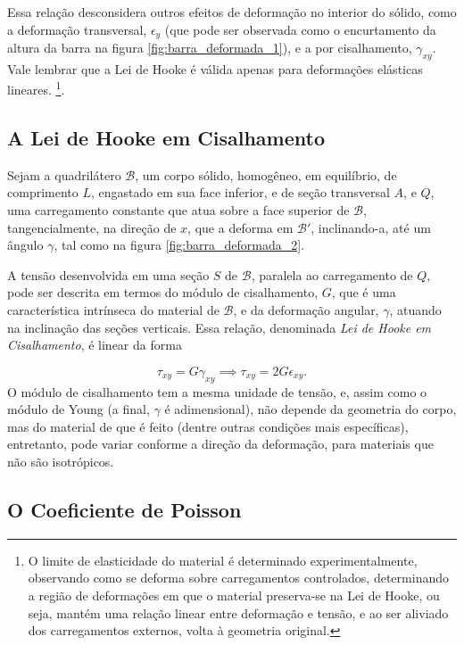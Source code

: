 Essa relação desconsidera outros efeitos de deformação no interior do sólido, como a deformação transversal, $\epsilon_y$ (que pode ser observada como o encurtamento da altura da barra na figura \ref{fig:barra_deformada_1}), e a por cisalhamento, $\gamma_{xy}$. Vale lembrar que a Lei de Hooke é válida apenas para deformações elásticas lineares. \footnote{O limite de elasticidade do material é determinado experimentalmente, observando como se deforma sobre carregamentos controlados, determinando a região de deformações em que o material preserva-se na Lei de Hooke, ou seja, mantém uma relação linear entre deformação e tensão, e ao ser aliviado dos carregamentos externos, volta à geometria original.}.

\subsection{A Lei de Hooke em Cisalhamento}

Sejam a quadrilátero $\mathcal{B}$, um corpo sólido, homogêneo, em equilíbrio, de comprimento $L$, engastado em sua face inferior, e de seção transversal $A$, e $Q$, uma carregamento constante que atua sobre a face superior de $\mathcal{B}$, tangencialmente, na direção de $x$, que a deforma em $\mathcal{B}'$, inclinando-a, até um ângulo $\gamma$, tal como na figura \ref{fig:barra_deformada_2}. 

A tensão desenvolvida em uma seção $S$ de $\mathcal{B}$, paralela ao carregamento de  $Q$, pode ser descrita em termos do módulo de cisalhamento, $G$, que é uma característica intrínseca do material de $\mathcal{B}$, e da deformação angular, $\gamma$, atuando na inclinação das seções verticais. Essa relação, denominada \emph{Lei de Hooke em Cisalhamento}, é linear da forma

\begin{equation}
    \tau_{xy} = G \gamma_{xy} \implies \tau_{xy} = 2G \epsilon_{xy}.
    \label{eq:lei_de_hooke_cisalhamento}
\end{equation}
O módulo de cisalhamento tem a mesma unidade de tensão, e, assim como o módulo de Young (a final, $\gamma$ é adimensional), não depende da geometria do corpo, mas do material de que é feito (dentre outras condições mais específicas), entretanto, pode variar conforme a direção da deformação, para materiais que não são isotrópicos.

\subsection{O Coeficiente de Poisson}

